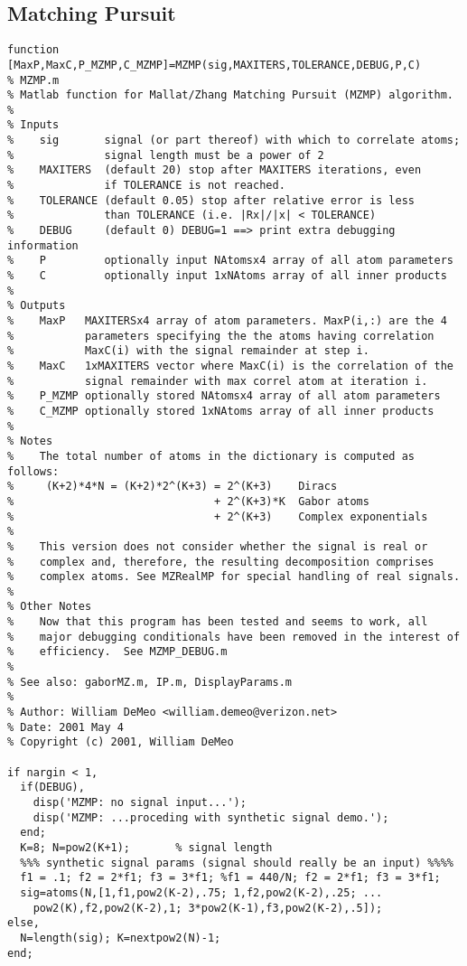 \subsection{Matching Pursuit}\label{sec:MZMP}
\begin{verbatim}
function [MaxP,MaxC,P_MZMP,C_MZMP]=MZMP(sig,MAXITERS,TOLERANCE,DEBUG,P,C)
% MZMP.m 
% Matlab function for Mallat/Zhang Matching Pursuit (MZMP) algorithm.
%
% Inputs
%    sig       signal (or part thereof) with which to correlate atoms;
%              signal length must be a power of 2
%    MAXITERS  (default 20) stop after MAXITERS iterations, even
%              if TOLERANCE is not reached.
%    TOLERANCE (default 0.05) stop after relative error is less 
%              than TOLERANCE (i.e. |Rx|/|x| < TOLERANCE)
%    DEBUG     (default 0) DEBUG=1 ==> print extra debugging information
%    P         optionally input NAtomsx4 array of all atom parameters
%    C         optionally input 1xNAtoms array of all inner products
%
% Outputs
%    MaxP   MAXITERSx4 array of atom parameters. MaxP(i,:) are the 4
%           parameters specifying the the atoms having correlation
%           MaxC(i) with the signal remainder at step i.
%    MaxC   1xMAXITERS vector where MaxC(i) is the correlation of the
%           signal remainder with max correl atom at iteration i.
%    P_MZMP optionally stored NAtomsx4 array of all atom parameters
%    C_MZMP optionally stored 1xNAtoms array of all inner products
%
% Notes
%    The total number of atoms in the dictionary is computed as follows:
%     (K+2)*4*N = (K+2)*2^(K+3) = 2^(K+3)    Diracs
%                               + 2^(K+3)*K  Gabor atoms
%                               + 2^(K+3)    Complex exponentials
%
%    This version does not consider whether the signal is real or
%    complex and, therefore, the resulting decomposition comprises
%    complex atoms. See MZRealMP for special handling of real signals.
%
% Other Notes
%    Now that this program has been tested and seems to work, all
%    major debugging conditionals have been removed in the interest of
%    efficiency.  See MZMP_DEBUG.m
%
% See also: gaborMZ.m, IP.m, DisplayParams.m
%
% Author: William DeMeo <william.demeo@verizon.net>
% Date: 2001 May 4
% Copyright (c) 2001, William DeMeo

if nargin < 1, 
  if(DEBUG),
    disp('MZMP: no signal input...');
    disp('MZMP: ...proceding with synthetic signal demo.');
  end;
  K=8; N=pow2(K+1);       % signal length
  %%% synthetic signal params (signal should really be an input) %%%%
  f1 = .1; f2 = 2*f1; f3 = 3*f1; %f1 = 440/N; f2 = 2*f1; f3 = 3*f1;
  sig=atoms(N,[1,f1,pow2(K-2),.75; 1,f2,pow2(K-2),.25; ...
    pow2(K),f2,pow2(K-2),1; 3*pow2(K-1),f3,pow2(K-2),.5]);
else,  
  N=length(sig); K=nextpow2(N)-1; 
end;


\end{verbatim}
